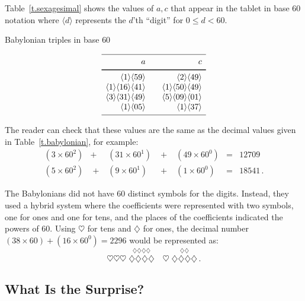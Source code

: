 Table~\ref{t.sexagesimal} shows the values of $a,c$ that appear in the tablet in base $60$ notation where $\langle d\rangle$ represents the $d$'th ``digit'' for $0\leq d<60$.
\begin{table}[ht]
\caption{Babylonian triples in base $60$}\label{t.sexagesimal}
\[
\begin{array}{r@{$\quad\quad$}r}
\hline
\noalign{\smallskip}
a&c\\
\noalign{\smallskip}\svhline\noalign{\smallskip}
\langle 1\rangle \langle 59 \rangle&\langle 2\rangle \langle 49 \rangle\\
\langle 1\rangle \langle 16 \rangle\langle 41\rangle&\langle 1\rangle \langle 50 \rangle\langle 49\rangle\\
\langle 3\rangle \langle 31 \rangle\langle 49\rangle&\langle 5\rangle \langle 09 \rangle\langle 01\rangle\\
\langle 1\rangle \langle 05 \rangle&\langle 1\rangle \langle 37 \rangle\\
\noalign{\smallskip}\hline
\end{array}
\]
\end{table}

 The reader can check that these values are the same as the decimal values given in Table~\ref{t.babylonian}, for example:
\[
\renewcommand{\arraystretch}{1.3}
\begin{array}{lclclcr}
(3\times 60^2) &+& (31\times 60^1) &\;+\;& (49\times 60^0) &=& 12709\\
(5\times 60^2) &\;+\;& (9\times 60^1) &\;+\;& (1\times 60^0) &=&18541\,.
\end{array}
\]

The Babylonians did not have $60$ distinct symbols for the digits. Instead, they used a hybrid system where the coefficients were represented with two symbols, one for ones and one for tens, and the places of the coefficients indicated the powers of $60$. Using  $\heartsuit$ for tens and $\diamondsuit$ for ones, the decimal number $(38\times 60)+(16\times 60^0)=2296$ would be represented as:
\[
\heartsuit\heartsuit\heartsuit \; \stackrel{\displaystyle\diamondsuit\diamondsuit\diamondsuit\diamondsuit}{\diamondsuit\diamondsuit\diamondsuit\diamondsuit}
\quad
\heartsuit \; \stackrel{\displaystyle\diamondsuit\diamondsuit}{\diamondsuit\diamondsuit\diamondsuit\diamondsuit}\,.
\]


\subsection*{What Is the Surprise?}


